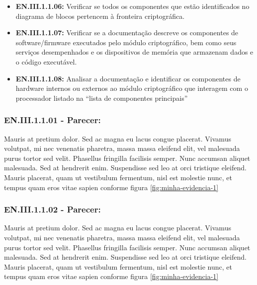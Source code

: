 \documentclass[12pt, a4paper]{article}
\begin{document}
\begin{itemize}[leftmargin=*, nosep]
        \item \textbf{EN.III.1.1.06:} Verificar se todos os componentes que estão identificados no diagrama de blocos pertencem à fronteira criptográfica.
        \item \textbf{EN.III.1.1.07:} Verificar se a documentação descreve os componentes de software/firmware executados pelo módulo criptográfico, bem como seus serviços desempenhados e os dispositivos de memória que armazenam dados e o código executável.
        \item \textbf{EN.III.1.1.08:}  Analisar a documentação e identificar os componentes de hardware internos ou externos ao módulo criptográfico que interagem com o processador listado na “lista de componentes principais”
    \end{itemize}

    \vspace{1cm} 
    
    \subsubsection*{EN.III.1.1.01 - Parecer:}
    
    Mauris at pretium dolor. Sed ac magna eu lacus congue placerat. Vivamus volutpat, mi nec venenatis pharetra, massa massa eleifend elit, vel malesuada purus tortor sed velit. Phasellus fringilla facilisis semper. Nunc accumsan aliquet malesuada. Sed at hendrerit enim. Suspendisse sed leo at orci tristique eleifend. Mauris placerat, quam ut vestibulum fermentum, nisl est molestie nunc, et tempus quam eros vitae sapien  conforme figura \ref{fig:minha-evidencia-1}
    
    \vspace{1cm} 
    
    \subsubsection*{EN.III.1.1.02 - Parecer:}
    
    Mauris at pretium dolor. Sed ac magna eu lacus congue placerat. Vivamus volutpat, mi nec venenatis pharetra, massa massa eleifend elit, vel malesuada purus tortor sed velit. Phasellus fringilla facilisis semper. Nunc accumsan aliquet malesuada. Sed at hendrerit enim. Suspendisse sed leo at orci tristique eleifend. Mauris placerat, quam ut vestibulum fermentum, nisl est molestie nunc, et tempus quam eros vitae sapien  conforme figura \ref{fig:minha-evidencia-1}
    
    \vspace{1cm} 
    
\end{document}
